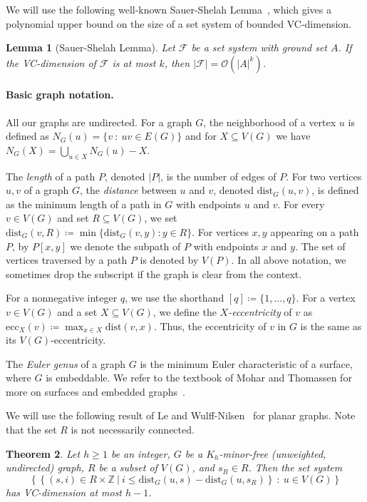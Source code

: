 \documentclass[11pt,a4paper]{article}
\newtheorem{lemma}{Lemma}[section]
\newtheorem{theorem}[lemma]{Theorem}
\newcommand{\dist}{\mathrm{dist}}
\newcommand{\ecc}{\mathrm{ecc}}
\renewcommand{\leq}{\leqslant}
\renewcommand{\ge}{\geqslant}
\renewcommand{\setminus}{-}
\begin{document}
We will use the following well-known Sauer-Shelah Lemma~\cite{Sauer72,Shelah72}, which gives a polynomial upper bound on the size of a set system of bounded VC-dimension.

\begin{lemma}[Sauer-Shelah Lemma]\label{lem:sauer-shelah}
  Let $\mathcal{F}$ be a set system with ground set $A$.
  If the VC-dimension of $\mathcal{F}$ is at most $k$, then $|\mathcal{F}|=\mathcal{O}(|A|^k)$.
\end{lemma}

\paragraph{Basic graph notation.} All our graphs are undirected.
For a graph $G$, the neighborhood of a vertex $u$ is defined as $N_G(u) = \{v~\colon~uv \in E(G)\}$
and for $X \subseteq V(G)$ we have $N_G(X) = \bigcup_{u \in X} N_G(u) \setminus X$. 

The {\em{length}} of a path $P$, denoted $|P|$, is the number of edges of $P$.
For two vertices $u,v$ of a graph $G$, the {\em{distance}} between $u$ and $v$,
denoted $\dist_G(u,v)$, is defined as the minimum length of a path in $G$ with endpoints $u$ and $v$.
For every $v\in V(G)$ and set $R \subseteq V(G)$, we set $\dist_G(v,R)\coloneqq \min\{\dist_G(v,y)\colon y\in R\}.$
For vertices $x,y$ appearing on a path $P$, by $P[x,y]$ we denote the subpath of $P$ with endpoints $x$ and $y$.
The set of vertices traversed by a path $P$ is denoted by $V(P)$.
In all above notation, we sometimes drop the subscript if the graph is clear from the context.

For a nonnegative integer $q$, we use the shorthand $[q]\coloneqq\{1,\ldots,q\}$.
For a vertex $v \in V(G)$ and a set $X \subseteq V(G)$, we define the \emph{$X$-eccentricity} of $v$ as
$\ecc_X(v) \coloneqq \max_{x \in X} \dist(v,x)$.
Thus, the eccentricity of $v$ in $G$ is the same as its $V(G)$-eccentricity.

The \emph{Euler genus} of a graph $G$ is the minimum Euler characteristic of a surface, where $G$ is embeddable.
We refer to the textbook of Mohar and Thomassen for more on surfaces and embedded graphs~\cite{MoharT01grap}.

We will use the following result of Le and Wulff-Nilsen~\cite[Theorem 1.3]{LeW24} for planar graphs. Note that the set $R$ is not necessarily connected.

\begin{theorem}\label{thm:LW}
  Let $h\ge 1$ be an integer, $G$ be a $K_h$-minor-free (unweighted, undirected) graph, $R$ be a subset of $V(G)$, and $s_R\in R$. Then the set system $$\left\{\left\{(s,i) \in R \times \mathbb{Z}~|~i \leq \dist_G(u,s)-\dist_G(u,s_R)\right\}~\colon~u \in V(G)\right\}$$
  has VC-dimension at most $h-1$.
\end{theorem}
\end{document}
